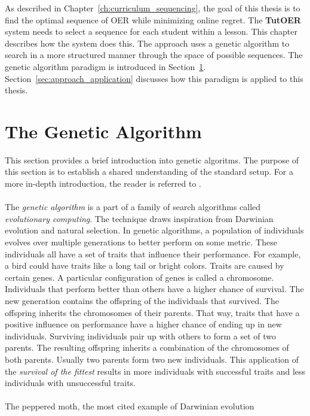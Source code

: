As described in Chapter~\ref{ch:curriculum_sequencing}, the goal of this thesis
is to find the optimal sequence of OER while minimizing online regret. The
\textbf{TutOER} system needs to select a sequence for each student within a
lesson. This chapter describes how the system does this. The approach uses a
genetic algorithm to search in a more structured manner through the space of possible
sequences. The genetic algorithm paradigm is introduced in
Section~\ref{sec:approach_intro}. Section~\ref{sec:approach_application}
discusses how this paradigm is applied to this thesis.

\section{The Genetic Algorithm}
\label{sec:approach_intro}
This section provides a brief introduction into genetic algoritms. The purpose
of this section is to establish a shared understanding of the standard setup. For a more
in-depth introduction, the reader is referred to \citep{Eiben2007}.\\\\
\noindent
The \emph{genetic algorithm} \citep{Holland1992} is a part of a family of
search algorithms called \emph{evolutionary computing}. The technique draws
inspiration from Darwinian evolution and natural selection. In genetic
algorithms, a population of individuals evolves over multiple generations to
better perform on some metric. These individuals all have a set of traits that
influence their performance. For example, a bird could have traits like a long
tail or bright colors. Traits are caused by certain genes. A particular
configuration of genes is called a chromosome. Individuals that perform better
than others have a higher chance of survival. The new generation contains the
offspring of the individuals that survived. The offspring inherits the
chromosomes of their parents. That way, traits that have a positive influence
on performance have a higher chance of ending up in new individuals. Surviving
individuals pair up with others to form a set of two parents. The resulting
offspring inherits a combination of the chromosomes of both parents. Usually
two parents form two new individuals. This application of the \emph{survival of
the fittest} results in more individuals with successful traits and less
individuals with unsuccessful traits.\\\\
\noindent
The peppered moth, the most cited example of Darwinian evolution
